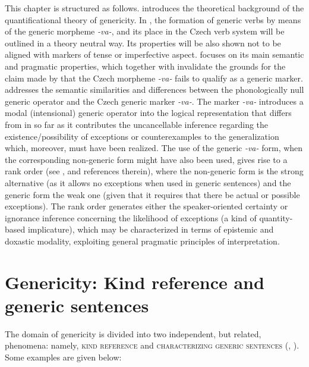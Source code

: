 \documentclass[output=paper,colorlinks,citecolor=brown]{langscibook}
\begin{document}
This chapter is structured as follows. 
introduces the theoretical background of the quantificational theory of genericity.
In , the formation of generic 
verbs by means of the generic morpheme \textit{-va-}, and its place in the Czech verb system will be outlined in a theory neutral
way. Its properties will be also shown not to be aligned with markers of tense or imperfective aspect. 
focuses on its main semantic and pragmatic properties, 
which together with  invalidate the grounds for the claim made by \citet{dahl1995}
that the Czech morpheme \textit{-va-} fails to qualify as a generic marker.
 addresses the semantic similarities and differences between 
the phonologically null generic operator  and 
the Czech generic marker \textit{-va-}. 
The marker \textit{-va-} introduces a 
modal (intensional) generic operator  into the logical representation 
that differs from   in so far as it contributes the uncancellable inference regarding the  existence/possibility of exceptions or counterexamples to the generalization which, moreover, must have been realized. The use of the generic \textit{-va-} form, when the corresponding non-generic form might have also been used, gives rise to a rank order (see \citealt{hornabbott2012,horn2017}, and references therein), where the non-generic form is the strong alternative (as it allows no exceptions when used in generic sentences) and the generic form the weak one (given that it requires that there be actual or possible exceptions). The rank order generates either the speaker-oriented certainty or ignorance inference concerning the likelihood of exceptions (a kind of quantity-based implicature), which may be characterized in terms of epistemic and doxastic modality, exploiting general pragmatic principles of interpretation.


\section{Genericity: Kind reference and generic sentences} \label{CharGenericity}

The domain of genericity is divided into two independent, 
but related, phenomena: namely, \textsc{kind reference} and \textsc{characterizing generic sentences} (\citealt{krifka1995genericity}, \citealt{carlpell1995generic}). Some examples are given below:\\
\end{document}
